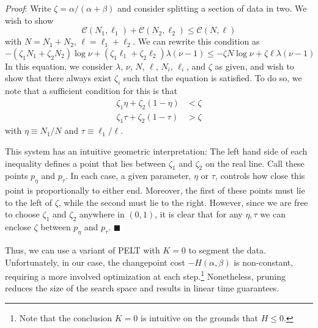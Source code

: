 \documentclass[11pt]{article}
\begin{document}
\emph{Proof}: Write $\zeta = \alpha / (\alpha + \beta)$ and consider splitting a section of data in two. We wish to show
\begin{equation}
    \mathcal{C}(N_1, \ell_1) + \mathcal{C}(N_2, \ell_2) \le \mathcal{C}(N, \ell)
\end{equation}
with $N = N_1 + N_2$, $\ell = \ell_1 + \ell_2$. We can rewrite this condition as
\begin{equation}
    -(\zeta_1 N_1 + \zeta_2 N_2) \log \nu + (\zeta_1 \ell_1 + \zeta_2 \ell_2) \lambda (\nu - 1)
    \le
    -\zeta N \log \nu + \zeta \ell \lambda (\nu - 1)
\end{equation}
In this equation, we consider $\lambda$, $\nu$, $N$, $\ell$, $N_i$, $\ell_i$, and $\zeta$ as given, and wish to show that there always exist $\zeta_i$ such that the equation is satisfied. To do so, we note that a sufficient condition for this is that
\begin{align}
    \zeta_1 \eta + \zeta_2 (1 - \eta) &< \zeta \\
    \zeta_1 \tau + \zeta_2 (1 - \tau) &> \zeta
\end{align}
with $\eta \equiv N_1/N$ and $\tau \equiv \ell_1/\ell$. 

This system has an intuitive geometric interpretation: The left hand side of each inequality defines a point that lies between $\zeta_1$ and $\zeta_2$ on the real line. Call these points $p_\eta$ and $p_\tau$. In each case, a given parameter, $\eta$ or $\tau$, controls how close this point is proportionally to either end. Moreover, the first of these points must lie to the left of $\zeta$, while the second must lie to the right. However, since we are free to choose $\zeta_1$ and $\zeta_2$ anywhere in $(0, 1)$, it is clear that for any $\eta, \tau$ we can enclose $\zeta$ between $p_\eta$ and $p_\tau$. $\blacksquare$

Thus, we can use a variant of PELT with $K = 0$ to segment the data. Unfortunately, in our case, the changepoint cost $-H(\alpha, \beta)$ is non-constant, requiring a more involved optimization at each step.\footnote{Note that the conclusion $K=0$ is intuitive on the grounds that $H \le 0$.} Nonetheless, pruning reduces the size of the search space and results in linear time guarantees.
\end{document}
